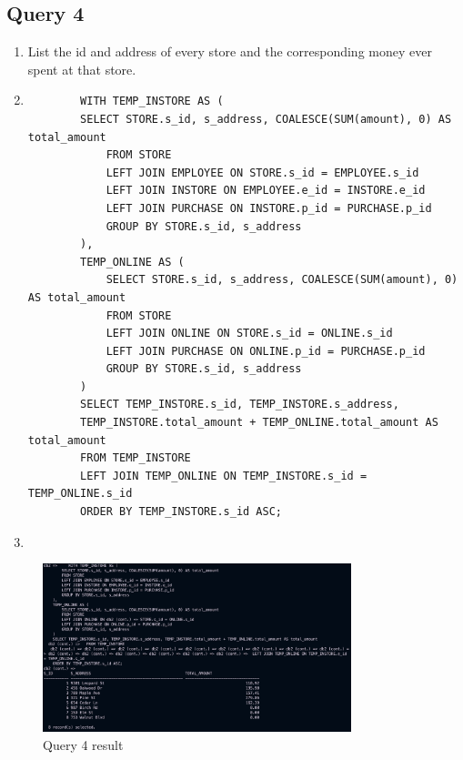 \documentclass[a4paper,11pt]{article}
\begin{document}
\subsection*{Query 4}
\begin{enumerate}[label=(\alph*)]
    \item List the id and address of every store and the corresponding money ever spent at that store.
    \item
        \begin{lstlisting}
        WITH TEMP_INSTORE AS (
        SELECT STORE.s_id, s_address, COALESCE(SUM(amount), 0) AS total_amount
            FROM STORE
            LEFT JOIN EMPLOYEE ON STORE.s_id = EMPLOYEE.s_id
            LEFT JOIN INSTORE ON EMPLOYEE.e_id = INSTORE.e_id
            LEFT JOIN PURCHASE ON INSTORE.p_id = PURCHASE.p_id
            GROUP BY STORE.s_id, s_address
        ),
        TEMP_ONLINE AS (
            SELECT STORE.s_id, s_address, COALESCE(SUM(amount), 0) AS total_amount
            FROM STORE
            LEFT JOIN ONLINE ON STORE.s_id = ONLINE.s_id
            LEFT JOIN PURCHASE ON ONLINE.p_id = PURCHASE.p_id
            GROUP BY STORE.s_id, s_address
        )
        SELECT TEMP_INSTORE.s_id, TEMP_INSTORE.s_address,
        TEMP_INSTORE.total_amount + TEMP_ONLINE.total_amount AS total_amount
        FROM TEMP_INSTORE
        LEFT JOIN TEMP_ONLINE ON TEMP_INSTORE.s_id = TEMP_ONLINE.s_id
        ORDER BY TEMP_INSTORE.s_id ASC;
        \end{lstlisting}

    \item
\end{enumerate}
\begin{figure}[H]
    \centering
    \includegraphics[width=0.8\textwidth]{Query4.png}
    \caption{Query 4 result}
\end{figure}
\end{document}
